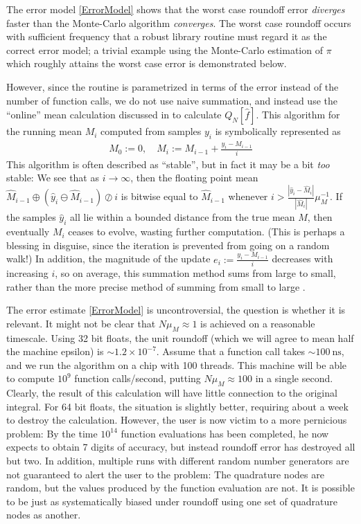 \documentclass{ansarticle}
\begin{document}
The error model \ref{ErrorModel} shows that the worst case roundoff error \emph{diverges} faster than the Monte-Carlo algorithm \emph{converges}.
The worst case roundoff occurs with sufficient frequency that a robust library routine must regard it as the correct error model; a trivial example using the Monte-Carlo estimation of $\pi$ which roughly attains the worst case error is demonstrated below.


However, since the routine is parametrized in terms of the error instead of the number of function calls, we do not use naive summation, and instead use the ``online'' mean calculation discussed in \citep{knuth1997art} to calculate $Q_{N}[\hat{f}]$.
This algorithm for the running mean $M_{i}$ computed from samples $y_{i}$ is symbolically represented as 
\begin{align*}
M_{0} := 0, \quad M_{i} := M_{i-1} + \frac{y_{i} - M_{i-1}}{i}
\end{align*}
This algorithm is often described as ``stable'', but in fact it may be a bit \emph{too} stable: We see that as $i \to \infty$, then the floating point mean $\hat{M}_{i-1}\oplus (\hat{y}_{i}\ominus \hat{M}_{i-1})\oslash i$ is bitwise equal to $\hat{M}_{i-1}$ whenever $i > \frac{|\hat{y}_{i}- \hat{M}_{i}|}{|\hat{M}_{i}|} \mu_{M}^{-1}$.
If the samples $\hat{y}_{i}$ all lie within a bounded distance from the true mean $M$, then eventually $M_{i}$ ceases to evolve, wasting further computation.
(This is perhaps a blessing in disguise, since the iteration is prevented from going on a random walk!)
In addition, the magnitude of the update $e_{i} :=  \frac{y_{i} - M_{i-1}}{i}$ decreases with increasing $i$, so on average, this summation method sums from large to small, rather than the more precise method of summing from small to large \citep{higham1993accuracy}.


The error estimate \ref{ErrorModel} is uncontroversial, the question is whether it is relevant.
It might not be clear that $N\mu_{M}\approx 1$ is achieved on a reasonable timescale.
Using 32 bit floats, the unit roundoff (which we will agree to mean half the machine epsilon) is ${\sim}1.2\times10^{-7}$.
Assume that a function call takes ${\sim}\SI{100}{\nano \second}$, and we run the algorithm on a chip with 100 threads.
This machine will be able to compute $10^{9}$ function calls/second, putting $N\mu_{M} \approx 100$ in a single second.
Clearly, the result of this calculation will have little connection to the original integral.
For 64 bit floats, the situation is slightly better, requiring about a week to destroy the calculation.
However, the user is now victim to a more pernicious problem: By the time $10^{14}$ function evaluations has been completed, he now expects to obtain 7 digits of accuracy, but instead roundoff error has destroyed all but two.
In addition, multiple runs with different random number generators are not guaranteed to alert the user to the problem: The quadrature nodes are random, but the values produced by the function evaluation are not.
It is possible to be just as systematically biased under roundoff using one set of quadrature nodes as another. 
\end{document}
